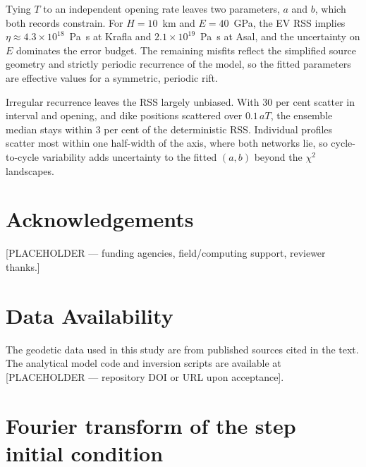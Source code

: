 \documentclass[extra]{gji}
\begin{document}
Tying $T$ to an independent opening rate leaves two parameters, $a$ and
$b$, which both records constrain.  For $H = 10$~km and $E = 40$~GPa, the
EV RSS implies $\eta \approx 4.3\times10^{18}$~Pa~s at Krafla and
$2.1\times10^{19}$~Pa~s at Asal, and the uncertainty on $E$ dominates the
error budget.  The remaining misfits reflect the simplified source
geometry and strictly periodic recurrence of the model, so the fitted
parameters are effective values for a symmetric, periodic rift.

Irregular recurrence leaves the RSS largely unbiased.  With 30 per cent
scatter in interval and opening, and dike positions scattered over
$0.1\,aT$, the ensemble median stays within 3 per cent of the
deterministic RSS.  Individual profiles scatter most within one
half-width of the axis, where both networks lie, so cycle-to-cycle
variability adds uncertainty to the fitted $(a,b)$ beyond the $\chi^2$
landscapes.

\section*{Acknowledgements}
[PLACEHOLDER --- funding agencies, field/computing support, reviewer thanks.]

\section*{Data Availability}
The geodetic data used in this study are from published sources cited in the
text. The analytical model code and inversion scripts are available at
[PLACEHOLDER --- repository DOI or URL upon acceptance].




\appendix

\section{Fourier transform of the step initial condition}
\label{app:step}
\end{document}
